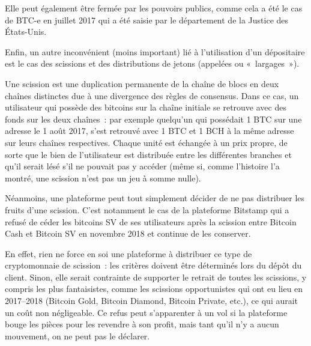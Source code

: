 Elle peut également être fermée par les pouvoirs publics, comme cela a été le cas de BTC-e en juillet 2017 qui a été saisie par le département de la Justice des États-Unis.

Enfin, un autre inconvénient (moins important) lié à l'utilisation d'un dépositaire est le cas des scissions et des distributions de jetons (appelées  ou «~largages~»). 

Une scission est une duplication permanente de la chaîne de blocs en deux chaînes distinctes due à une divergence des règles de consensus. Dans ce cas, un utilisateur qui possède des bitcoins sur la chaîne initiale se retrouve avec des fonds sur les deux chaînes~: par exemple quelqu'un qui possédait 1 BTC sur une adresse le 1\ier{} août 2017, s'est retrouvé avec 1 BTC et 1 BCH à la même adresse sur leurs chaînes respectives. Chaque unité est échangée à un prix propre, de sorte que le bien de l'utilisateur est distribuée entre les différentes branches et qu'il serait lésé s'il ne pouvait pas y accéder (même si, comme l'histoire l'a montré, une scission n'est pas un jeu à somme nulle).

Néanmoins, une plateforme peut tout simplement décider de ne pas distribuer les fruits d'une scission. C'est notamment le cas de la plateforme Bitstamp qui a refusé de céder les bitcoins SV de ses utilisateurs après la scission entre Bitcoin Cash et Bitcoin SV en novembre 2018 et continue de les conserver.

En effet, rien ne force en soi une plateforme à distribuer ce type de cryptomonnaie de scission~: les critères doivent être déterminés lors du dépôt du client. Sinon, elle serait contrainte de supporter le retrait de toutes les scissions, y compris les plus fantaisistes, comme les scissions opportunistes qui ont eu lieu en 2017--2018 (Bitcoin Gold, Bitcoin Diamond, Bitcoin Private, etc.), ce qui aurait un coût non négligeable. Ce refus peut s'apparenter à un vol si la plateforme bouge les pièces pour les revendre à son profit, mais tant qu'il n'y a aucun mouvement, on ne peut pas le déclarer.

